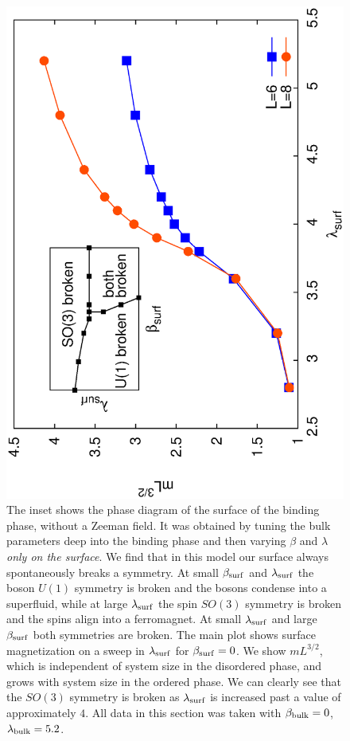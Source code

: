 \begin{figure}
\includegraphics[angle=-90,width=\linewidth]{figures/heissurf.eps}
\caption{The inset shows the phase diagram of the surface of the binding phase, without a Zeeman field. It was obtained by tuning the bulk parameters deep into the binding phase and then varying $\beta$ and $\lambda$ {\em only on the surface}.  We find that in this model our surface always spontaneously breaks a symmetry. At small $\beta_{\rm surf}$ and $\lambda_{\rm surf}$ the boson $U(1)$ symmetry is broken and the bosons condense into a superfluid, while at large $\lambda_{\rm surf}$ the spin $SO(3)$ symmetry is broken and the spins align into a ferromagnet. At small $\lambda_{\rm surf}$ and large $\beta_{\rm surf}$ both symmetries are broken.  The main plot shows surface magnetization on a sweep in $\lambda_{\rm surf}$ for $\beta_{\rm surf}=0$. We show $mL^{3/2}$, which is independent of system size in the disordered phase, and grows with system size in the ordered phase. We can clearly see that the $SO(3)$ symmetry is broken as $\lambda_{\rm surf}$ is increased past a value of approximately $4$. All data in this section was taken with $\beta_{\rm bulk}=0$, $\lambda_{\rm bulk}=5.2$.}
\label{heissurf}
\end{figure}


